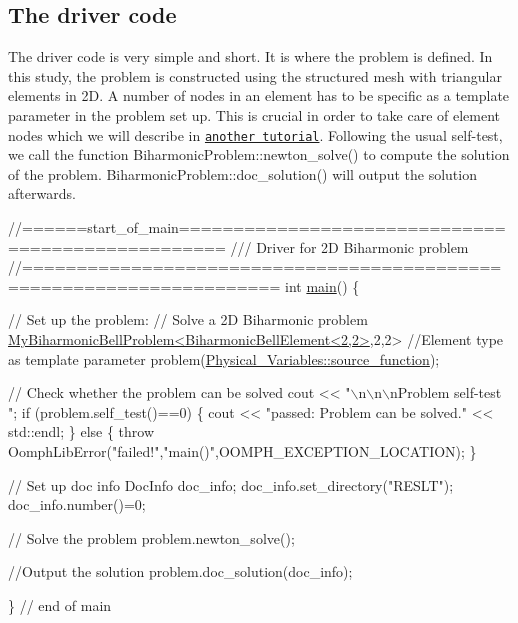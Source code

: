 \hypertarget{index_main}{}\subsection{The driver code}\label{index_main}
The driver code is very simple and short. It is where the problem is defined. In this study, the problem is constructed using the structured mesh with triangular elements in 2D. A number of nodes in an element has to be specific as a template parameter in the problem set up. This is crucial in order to take care of element nodes which we will describe in \href{../../../shell/linear_shell/html/index.html}{\tt another tutorial}. Following the usual self-\/test, we call the function {\ttfamily Biharmonic\+Problem\+::newton\+\_\+solve()} to compute the solution of the problem. {\ttfamily Biharmonic\+Problem\+::doc\+\_\+solution()} will output the solution afterwards.

 
\begin{DoxyCodeInclude}
\textcolor{comment}{//======start\_of\_main==================================================}
\textcolor{comment}{/// Driver for 2D Biharmonic problem}
\textcolor{comment}{}\textcolor{comment}{//=====================================================================}
\textcolor{keywordtype}{int} \hyperlink{structured__2d__biharmonic__bellelement_8cc_ae66f6b31b5ad750f1fe042a706a4e3d4}{main}()
\{

 \textcolor{comment}{// Set up the problem: }
 \textcolor{comment}{// Solve a 2D Biharmonic problem }
 \hyperlink{classMyBiharmonicBellProblem}{MyBiharmonicBellProblem<BiharmonicBellElement<2,2>},2,2> \textcolor{comment}{
      //Element type as template parameter}
  problem(\hyperlink{namespacePhysical__Variables_ae11027d76c5f512b7db6a1b6d17dc792}{Physical\_Variables::source\_function});
 
 \textcolor{comment}{// Check whether the problem can be solved}
 cout << \textcolor{stringliteral}{"\(\backslash\)n\(\backslash\)n\(\backslash\)nProblem self-test "};
 \textcolor{keywordflow}{if} (problem.self\_test()==0)  
  \{
   cout << \textcolor{stringliteral}{"passed: Problem can be solved."} << std::endl;
  \}
 \textcolor{keywordflow}{else} 
  \{
   \textcolor{keywordflow}{throw} OomphLibError(\textcolor{stringliteral}{"failed!"},\textcolor{stringliteral}{"main()"},OOMPH\_EXCEPTION\_LOCATION);
  \}
  
 \textcolor{comment}{// Set up doc info}
 DocInfo doc\_info;
 doc\_info.set\_directory(\textcolor{stringliteral}{"RESLT"});
 doc\_info.number()=0;

 \textcolor{comment}{// Solve the problem}
 problem.newton\_solve();
 
 \textcolor{comment}{//Output the solution}
 problem.doc\_solution(doc\_info);

\} \textcolor{comment}{// end of main}

\end{DoxyCodeInclude}




